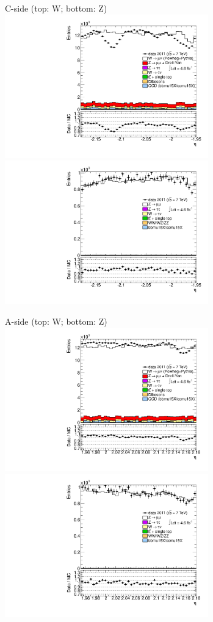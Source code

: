 {

\colb[T]

C-side (top: W; bottom: Z)
\centering
\includegraphics[width=0.66\textwidth]{dates/20130306/figures/etaphi/W_10_C_stack_l_eta_POS} \\
\includegraphics[width=0.66\textwidth]{dates/20130306/figures/etaphi/Z_10_C_stack_lP_eta_ALL.pdf}

A-side (top: W; bottom: Z)
\centering
\includegraphics[width=0.66\textwidth]{dates/20130306/figures/etaphi/W_10_A_stack_l_eta_POS} \\
\includegraphics[width=0.66\textwidth]{dates/20130306/figures/etaphi/Z_10_A_stack_lP_eta_ALL.pdf} 

\cole
}


